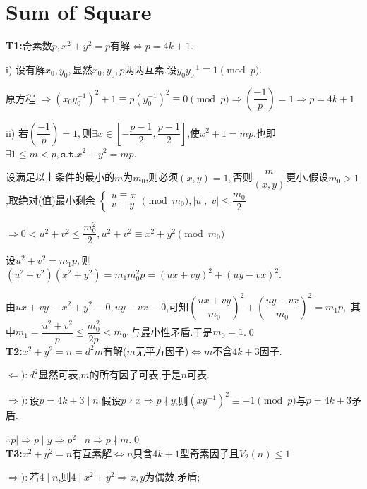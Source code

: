 
\section{Sum of Square}

{\bf T1:}奇素数$ p,x^2 + y^2 = p$有解$ \Leftrightarrow p = 4k + 1$.

i) 设有解$ x_0, y_0,$显然$ x_0,y_0,p$两两互素.设$ y_0y_0^{-1} \equiv 1 \pmod p$.

原方程 $ \Rightarrow (x_0y_0^{-1})^2 + 1 \equiv p(y_0^{-1})^2 \equiv 0\pmod p\Rightarrow (\dfrac{-1}{p}) = 1\Rightarrow p = 4k +  1$

ii) 若$ (\dfrac{-1}{p}) = 1, $则$ \exists x\in [-\dfrac{p-1}{2},\dfrac{p-1}{2}]$,使$ x^2+1=mp$.也即$ \exists 1 \le m < p,\texttt{s.t.} x^2+y^2=mp$.

设满足以上条件的最小的$ m$为$ m_0$,则必须$ (x,y) = 1,$否则$ \dfrac{m}{(x,y)}$更小.假设$ m_0>1$,取绝对(值)最小剩余
$ \left \{ \begin{matrix}u \equiv x \\ v \equiv y \end{matrix}\right .\pmod {m_0}, |u|,|v|\le \dfrac{m_0}{2}$ 

$ \Rightarrow 0 < u^2 + v^2 \le \dfrac{m_0^2}{2}, u^2 + v^2 \equiv x^2+y^2\pmod {m_0}$

设$ u^2+v^2=m_1p,$则$ (u^2+v^2)(x^2+y^2)=m_1m_0^2p = (ux+vy)^2 +(uy-vx)^2$.

由$ ux+vy \equiv x^2+y^2\equiv0, uy-vx\equiv 0$,可知$ (\dfrac{ux+vy}{m_0})^2+(\dfrac{uy-vx}{m_0})^2=m_1p,$
其中$ m_1=\dfrac{u^2+v^2}{p}\le \dfrac{m_0^2}{2p}<m_0,$与最小性矛盾.于是$ m_0=1$.\qed
\\

{\bf T2:}$ x^2+y^2=n=d^2m$有解($ m$无平方因子)$ \Leftrightarrow m$不含$ 4k+3$因子.

$ \Leftarrow ):d^2$显然可表,$ m$的所有因子可表,于是$ n$可表.

$ \Rightarrow ):$设$ p=4k+3 \mid n$.假设$ p\nmid x\Rightarrow p\nmid y$,则$ (xy^{-1})^2 \equiv -1 \pmod p$与$ p=4k+3$矛盾.

$ \therefore p\mid \Rightarrow p\mid y \Rightarrow p^2\mid n \Rightarrow  p \nmid m$.\qed
\\

{\bf T3:}$ x^2+y^2=n$有互素解$\Leftrightarrow n $只含$ 4k+1$型奇素因子且$ V_2(n)\le 1$

$ \Rightarrow ):$若$ 4\mid n$,则$ 4\mid x^2+y^2\Rightarrow x,y$为偶数,矛盾;

